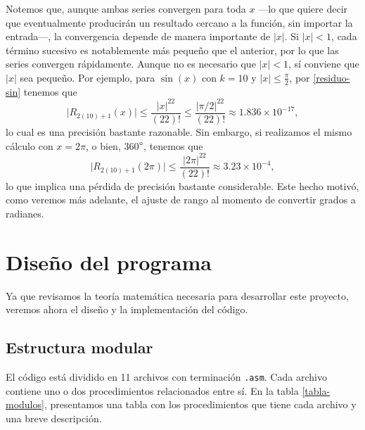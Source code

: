 \documentclass[12pt]{article}
\begin{document}
Notemos que, aunque ambas series convergen para toda $x$ ---lo que quiere decir
que eventualmente producirán un resultado cercano a la función, sin importar la
entrada---, la convergencia depende de manera importante de $\vert x \vert$. Si
$\vert x \vert < 1$, cada término sucesivo es notablemente más pequeño que el
anterior, por lo que las series convergen rápidamente. Aunque no es necesario
que $\vert x \vert < 1$, sí conviene que $\vert x \vert$ sea pequeño. Por
ejemplo, para $\sin(x)$ con $k=10$ y $\vert x \vert \leq \frac{\pi}{2}$, por
\eqref{residuo-sin} tenemos que
\begin{equation} \label{eq:residuo-k10}
  \vert R_{2(10)+1}(x) \vert \leq \frac{ \vert x \vert^{22} }{ (22)! }
  \leq \frac{ \vert \pi/2 \vert^{22} }{ (22)! }
  \approx 1.836 \times 10^{-17},
\end{equation}
lo cual es una precisión bastante razonable. Sin embargo, si realizamos el
mismo cálculo con $x = 2\pi$, o bien, 360$\degree$, tenemos que
\begin{equation}
  \vert R_{2(10)+1}(2\pi) \vert \leq \frac{ \vert 2\pi \vert^{22} }{ (22)! }
  \approx 3.23 \times 10^{-4},
\end{equation}
lo que implica una pérdida de precisión bastante considerable. Este hecho
motivó, como veremos más adelante, el ajuste de rango al momento de convertir
grados a radianes.

\section{Diseño del programa}

Ya que revisamos la teoría matemática necesaria para desarrollar este proyecto,
veremos ahora el diseño y la implementación del código.

\subsection{Estructura modular}

El código está dividido en 11 archivos con terminación \texttt{.asm}. Cada
archivo contiene uno o dos procedimientos relacionados entre sí. En la tabla
\ref{tabla-modulos}, presentamos una tabla con los procedimientos que tiene
cada archivo y una breve descripción.
\end{document}
